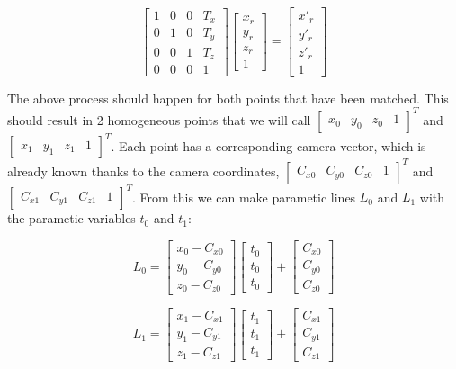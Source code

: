 \[
\begin{bmatrix}
  1 & 0 & 0 & T_x\\
  0 & 1 & 0 & T_y\\
  0 & 0 & 1 & T_z\\
  0 & 0 & 0 & 1
\end{bmatrix}
\begin{bmatrix}
  x_r\\
  y_r\\
  z_r\\
  1
\end{bmatrix}
=
\begin{bmatrix}
  x'_r\\
  y'_r\\
  z'_r\\
  1
\end{bmatrix}
\]

The above process should happen for both points that have been matched.
This should result in 2 homogeneous points that we will call $\begin{bmatrix}x_0 & y_0 & z_0 & 1 \end{bmatrix}^T$
and $\begin{bmatrix}x_1 & y_1 & z_1 & 1 \end{bmatrix}^T$. Each point has a corresponding camera vector,
which is already known thanks to the camera coordinates, $\begin{bmatrix}C_{x0} & C_{y0} & C_{z0} & 1 \end{bmatrix}^T$
and $\begin{bmatrix}C_{x1} & C_{y1} & C_{z1} & 1 \end{bmatrix}^T$. From this we can make parametic lines $L_0$ and $L_1$
with the parametic variables $t_0$ and $t_1$:

\[
L_0 =
\begin{bmatrix}
  x_0 - C_{x0}\\
  y_0 - C_{y0}\\
  z_0 - C_{z0}
\end{bmatrix}
\begin{bmatrix}
  t_0\\
  t_0\\
  t_0
\end{bmatrix}
+
\begin{bmatrix}
  C_{x0}\\
  C_{y0}\\
  C_{z0}
\end{bmatrix}
\]

\[
L_1 =
\begin{bmatrix}
  x_1 - C_{x1}\\
  y_1 - C_{y1}\\
  z_1 - C_{z1}
\end{bmatrix}
\begin{bmatrix}
  t_1\\
  t_1\\
  t_1
\end{bmatrix}
+
\begin{bmatrix}
  C_{x1}\\
  C_{y1}\\
  C_{z1}
\end{bmatrix}
\]


